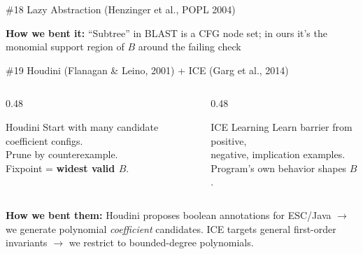 \documentclass[aspectratio=169]{beamer}
\begin{document}
\begin{frame}{\#18 Lazy Abstraction (Henzinger et al., POPL 2004)}

\vspace{0.8em}
\textbf{How we bent it:} ``Subtree'' in BLAST is a CFG node set; in ours it's the monomial support region of $B$ around the failing check
\end{frame}


\begin{frame}{\#19 Houdini (Flanagan \& Leino, 2001) + ICE (Garg et al., 2014)}
\begin{columns}[c]
\begin{column}{0.48\textwidth}
\begin{block}{Houdini}
Start with many candidate coefficient configs.\\
Prune by counterexample.\\
Fixpoint = \textbf{widest valid $B$}.
\end{block}
\end{column}
\begin{column}{0.48\textwidth}
\begin{block}{ICE Learning}
Learn barrier from \textcolor{safe}{positive},\\
\textcolor{unsafe}{negative}, \textcolor{accent}{implication} examples.\\
Program's own behavior shapes $B$.
\end{block}
\end{column}
\end{columns}

\vspace{0.8em}
\textbf{How we bent them:} Houdini proposes boolean annotations for ESC/Java $\to$ we generate polynomial \emph{coefficient} candidates. ICE targets general first-order invariants $\to$ we restrict to bounded-degree polynomials.
\end{frame}
\end{document}
